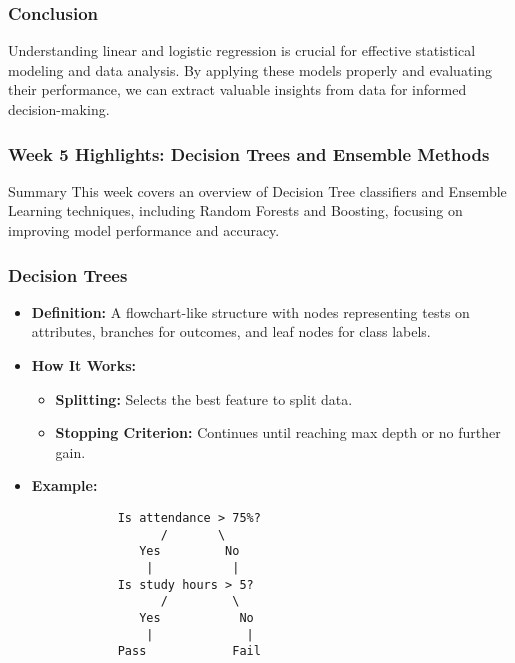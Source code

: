 \documentclass[aspectratio=169]{beamer}
\begin{document}
\begin{frame}[fragile]
    \frametitle{Conclusion}
    \begin{block}{}
        Understanding linear and logistic regression is crucial for effective statistical modeling and data analysis. By applying these models properly and evaluating their performance, we can extract valuable insights from data for informed decision-making.
    \end{block}
\end{frame}

\begin{frame}[fragile]
    \frametitle{Week 5 Highlights: Decision Trees and Ensemble Methods}
    \begin{block}{Summary}
        This week covers an overview of Decision Tree classifiers and Ensemble Learning techniques, including Random Forests and Boosting, focusing on improving model performance and accuracy.
    \end{block}
\end{frame}

\begin{frame}[fragile]
    \frametitle{Decision Trees}
    \begin{itemize}
        \item \textbf{Definition:} A flowchart-like structure with nodes representing tests on attributes, branches for outcomes, and leaf nodes for class labels.
        \item \textbf{How It Works:}
            \begin{itemize}
                \item \textbf{Splitting:} Selects the best feature to split data.
                \item \textbf{Stopping Criterion:} Continues until reaching max depth or no further gain.
            \end{itemize}
        \item \textbf{Example:}
            \begin{lstlisting}
            Is attendance > 75%?
                  /       \
               Yes         No
                |           |
            Is study hours > 5? 
                  /         \
               Yes           No
                |             |
            Pass            Fail
            \end{lstlisting}
    \end{itemize}
\end{frame}
\end{document}
